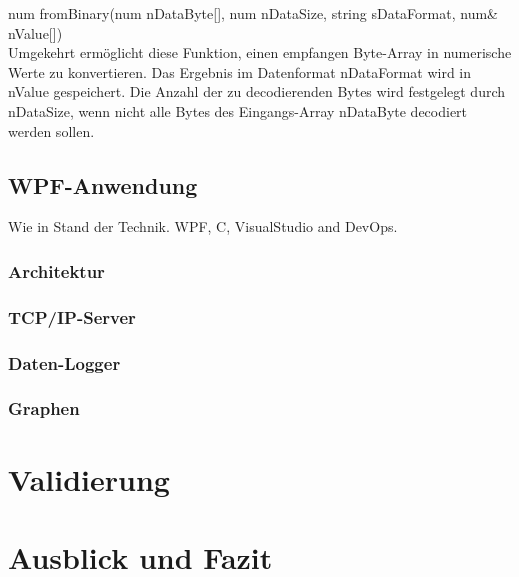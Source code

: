\documentclass[ a4paper,
                oneside,
                toc=bibliography,
                toc=listof
                ]{scrbook}
\begin{document}
	num fromBinary(num nDataByte[], num nDataSize, string sDataFormat, num\& nValue[])\\
	Umgekehrt ermöglicht diese Funktion, einen empfangen Byte-Array in numerische Werte zu konvertieren. Das Ergebnis im Datenformat nDataFormat wird in nValue gespeichert. Die Anzahl der zu decodierenden Bytes wird festgelegt durch nDataSize, wenn nicht alle Bytes des Eingangs-Array nDataByte decodiert werden sollen.
	
	\section{WPF-Anwendung}
	Wie in Stand der Technik. WPF, C, VisualStudio and DevOps.
	
	\subsection{Architektur}
	
   	\subsection{TCP/IP-Server}
   	
   	\subsection{Daten-Logger}
   	
   	\subsection{Graphen}
   	
   	
   	\chapter{Validierung}
   	
   	\chapter{Ausblick und Fazit}
   	
   	\backmatter
   	
   	
   	\cleardoublepage
   	\listoffigures
   	\cleardoublepage
   	\listoftables
   	\cleardoublepage
   	
   	\cleardoublepage
   	\printbibliography
   	
   
\end{document}
